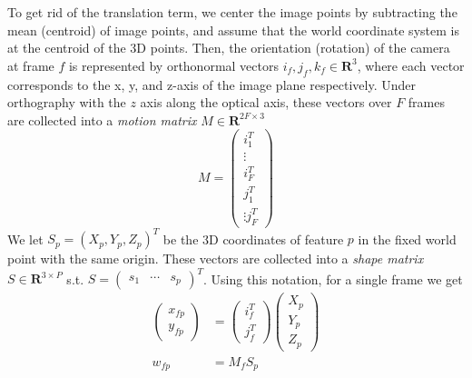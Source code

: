 To get rid of the translation term, we center the image points by
subtracting the mean (centroid) of image points, and assume that
the world coordinate system is at the centroid of the 3D points. Then,
the orientation (rotation)
of the camera at frame $f$ is represented by orthonormal
vectors $i_f, j_f, k_f \in \mathbf{R}^{3}$, where each vector
corresponds to the x, y, and z-axis of the image plane
respectively. Under orthography with the $z$ axis along the optical
axis, these vectors over $F$ frames are collected into a
\emph{motion matrix} $M\in \mathbf{R}^{2F \times 3}$ $$M =
\begin{pmatrix}
  i_1^T\\ \vdots \\  i_F^T \\ j_1^T \\ \vdots j_F^T
\end{pmatrix}
$$
We let $S_p = (X_p, Y_p, Z_p)^T$ be the 3D coordinates of feature $p$ in the fixed world point with the same origin. These vectors are collected into a
\emph{shape matrix} $S\in \mathbf{R}^{3 \times P}$ s.t. $S =
\begin{pmatrix}
  s_1 & \cdots & s_p
\end{pmatrix}^T$. Using this notation, for a single frame we get
\begin{align*}
  \begin{pmatrix}
    x_{fp}\\y_{fp}
  \end{pmatrix} &=
  \begin{pmatrix}
    i_{f}^T\\j_{f}^T
  \end{pmatrix}
  \begin{pmatrix}
    X_p\\ Y_p\\ Z_p
  \end{pmatrix}\\
w_{fp} &= M_fS_p  
\end{align*}

